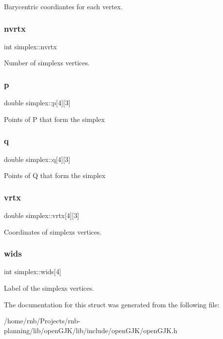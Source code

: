 Barycentric coordiantes for each vertex. \mbox{\label{structsimplex_aa906f22fbbb2294125763acaefc1dbca}} 
\subsubsection{\texorpdfstring{nvrtx}{nvrtx}}
{\footnotesize\ttfamily int simplex\+::nvrtx}

Number of simplex\textquotesingle{}s vertices. \mbox{\label{structsimplex_a9784d399d1d417f3545c1bdc961bfac8}} 
\subsubsection{\texorpdfstring{p}{p}}
{\footnotesize\ttfamily double simplex\+::p\mbox{[}4\mbox{]}\mbox{[}3\mbox{]}}

Points of P that form the simplex \mbox{\label{structsimplex_a68c12347e53a0203a32b05cae1b18134}} 
\subsubsection{\texorpdfstring{q}{q}}
{\footnotesize\ttfamily double simplex\+::q\mbox{[}4\mbox{]}\mbox{[}3\mbox{]}}

Points of Q that form the simplex \mbox{\label{structsimplex_a8d5910f99cfc91911760b293a23bdf7c}} 
\subsubsection{\texorpdfstring{vrtx}{vrtx}}
{\footnotesize\ttfamily double simplex\+::vrtx\mbox{[}4\mbox{]}\mbox{[}3\mbox{]}}

Coordinates of simplex\textquotesingle{}s vertices. \mbox{\label{structsimplex_a803e0af74fc3038ff163c4a660bb7934}} 
\subsubsection{\texorpdfstring{wids}{wids}}
{\footnotesize\ttfamily int simplex\+::wids\mbox{[}4\mbox{]}}

Label of the simplex\textquotesingle{}s vertices. 

The documentation for this struct was generated from the following file\+:\begin{DoxyCompactItemize}
\item 
/home/rnb/\+Projects/rnb-\/planning/lib/open\+G\+J\+K/lib/include/open\+G\+J\+K/open\+G\+J\+K.\+h\end{DoxyCompactItemize}
